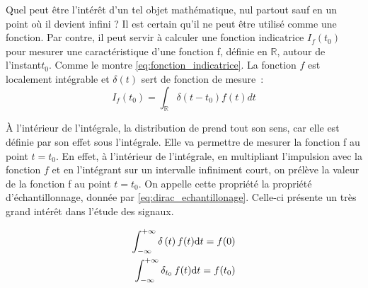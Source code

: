\begin{remark}{}

	Quel peut être l'intérêt d'un tel objet mathématique, nul
        partout sauf en un point où il devient infini ? Il est certain
        qu'il ne peut être utilisé comme une fonction. Par contre, il
        peut servir à calculer une fonction indicatrice
        $I_{f}(t_0)$ pour mesurer une caractéristique d'une
        fonction f, définie en $\mathbb{R}$, autour de l'instant$t_0$.
        Comme le montre \eqref{eq:fonction_indicatrice}. La fonction $f$ est
        localement intégrable et $\delta(t)$ sert de fonction de mesure~:
	\begin{equation}\label{eq:fonction_indicatrice}
          I_{f}(t_0)=\int_{\mathbb{R}}\delta(t-t_0)f(t)dt
	\end{equation}
	
	À l'intérieur de l'intégrale, la distribution de \Dirac{}
        prend tout son sens, car elle est définie par son effet sous
        l'intégrale. Elle va permettre de mesurer la fonction f au
        point $t = t_0$. En effet, à l'intérieur de l'intégrale, en
        multipliant l'impulsion avec la fonction $f$ et en l'intégrant
        sur un intervalle infiniment court, on prélève la valeur de
        la fonction f au point $t = t_0$. On appelle cette propriété
        la propriété d'échantillonnage, donnée par
        \eqref{eq:dirac_echantillonage}. Celle-ci présente un très grand
        intérêt dans l'étude des signaux.
	
	 \begin{eqnarray}\label{eq:dirac_echantillonage}
           \int_{-\infty}^{+\infty} \delta\left(t\right)  f(t) \mathrm{d{}} t  = f(0)  \\ 
           \int_{-\infty}^{+\infty} \delta_{t_0}\, f(t) \mathrm{d{}} t  = f(t_0) \nonumber 
	 \end{eqnarray}
	

\end{remark}
